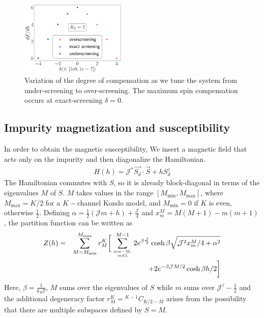 \documentclass[reprint,prb,superscriptaddress]{revtex4-2}
\begin{document}
\begin{figure}[htpb]
	\centering
	\includegraphics[width=0.45\textwidth]{plt/deg_of_comp.pdf}
	\caption{Variation of the degree of compensation as we tune the system from under-screening to over-screening. The maximum spin compensation occurs at exact-screening \(\delta=0\).}
\end{figure}

\subsection{Impurity magnetization and susceptibility}
\label{sec:imp_suscept}
In order to obtain the magnetic susceptibility, We insert a magnetic field that acts only on the impurity and then diagonalize the Hamiltonian.
\begin{align}
	\label{star graph_field_hamiltonian}
	H(h) = {\mathcal{J}^*} \vec{S_d}\cdot\vec{S} + h S_d^z
\end{align}
The Hamiltonian commutes with \(S\), so it is already block-diagonal in terms of the eigenvalues \(M\) of \(S\). \(M\) takes values in the range \(\left[M_\text{min}, M_\text{max}\right]\), where \(M_\text{max} = K/2\) for a \(K-\)channel Kondo model, and \(M_\text{min} = 0\)  if \(K\) is even, otherwise \(\frac{1}{2}\). Defining \(\alpha = \frac{1}{2}\left({\mathcal{J}}m + h\right) + \frac{{\mathcal{J}}}{4}\) and \(x^M_m = M(M+1) - m(m+1)\), the partition function can be written as
\begin{eqnarray}
Z(h) &=&\sum_{M=M_\text{min}}^{M_\text{max}}r^K_M\bigg[\sum_{m=-M, \atop{m\in \mathbb{Z}}}^{M-1}2e^{\beta \frac{{\mathcal{J}}}{4}}\cosh \beta\sqrt{{\mathcal{J}}^2x^M_m/4 + \alpha^2} \nonumber\\
&&\hspace{2cm}+ 2e^{-\beta {\mathcal{J}}M/2}\cosh \beta h/2\bigg]
\end{eqnarray}
Here, \(\beta = \frac{1}{k_B T}\), \(M\) sums over the eigenvalues of \(S\) while \(m\) sums over \({\mathcal{J}}^z - \frac{1}{2}\) and the additional degeneracy factor \(r^K_M= {}^{K-1}C_{K/2 - M}\) arises from the possibility that there are multiple subspaces defined by \(S=M\). 
\end{document}
